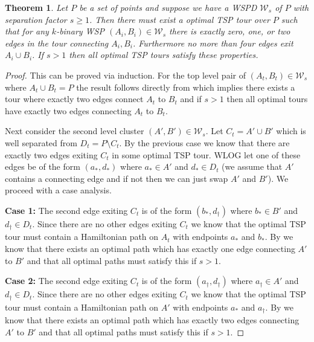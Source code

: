 \documentclass{article}
\newcommand{\PairDecomp}{\mathcal{W}}
\newtheorem{thm}{Theorem}[section]
\theoremstyle{definition}
\begin{document}
\begin{thm}\label{thm:bin_wspd_tour_structure}
    Let $P$ be a set of points and suppose we have a WSPD $\PairDecomp_s$ of $P$ with separation factor $s \geq 1$. 
    Then there must exist a optimal TSP tour over $P$ such that for any $k$-binary WSP $(A_i, B_i) \in \PairDecomp_s$ there is exactly zero, one, or two edges in the tour connecting $A_i,B_i$. Furthermore no more than four edges exit $A_i \cup B_i$.
    If $s > 1$ then all optimal TSP tours satisfy these properties.
\end{thm}
\begin{proof}
    This can be proved via induction. 
    For the top level pair of $(A_t, B_t) \in \PairDecomp_s$ where $A_t \cup B_t = P$ the result follows directly from  which implies there exists a tour where exactly two edges connect $A_t$ to $B_t$ and if $s > 1$ then all optimal tours have exactly two edges connecting $A_t$ to $B_t$.
    
    Next consider the second level cluster $(A', B') \in \PairDecomp_s$. Let $C_t = A' \cup B'$ which is well separated from $D_t = P \setminus C_t$.
    By the previous case we know that there are exactly two edges exiting $C_t$ in some optimal TSP tour.
    WLOG let one of these edges be of the form $(a_*, d_*)$ where $a_* \in A'$ and $d_* \in D_t$ (we assume that $A'$ contains a connecting edge and if not then we can just swap $A'$ and $B'$).
    We proceed with a case analysis.

    \textbf{Case 1:} The second edge exiting $C_t$ is of the form $(b_*, d_\dagger)$ where $b_* \in B'$ and $d_\dagger \in D_t$.
    Since there are no other edges exiting $C_t$ we know that the optimal TSP tour must contain a Hamiltonian path on $A_t$ with endpoints $a_*$ and $b_*$.
    By  we know that there exists an optimal path which has exactly one edge connecting $A'$ to $B'$ and that all optimal paths must satisfy this if $s > 1$.

    \textbf{Case 2:} The second edge exiting $C_t$ is of the form $(a_\dagger, d_\dagger)$ where $a_\dagger \in A'$ and $d_\dagger \in D_t$.
    Since there are no other edges exiting $C_t$ we know that the optimal TSP tour must contain a Hamiltonian path on $A'$ with endpoints $a_*$ and $a_\dagger$.
    By  we know that there exists an optimal path which has exactly two edges connecting $A'$ to $B'$ and that all optimal paths must satisfy this if $s > 1$.


\end{proof}
\end{document}
